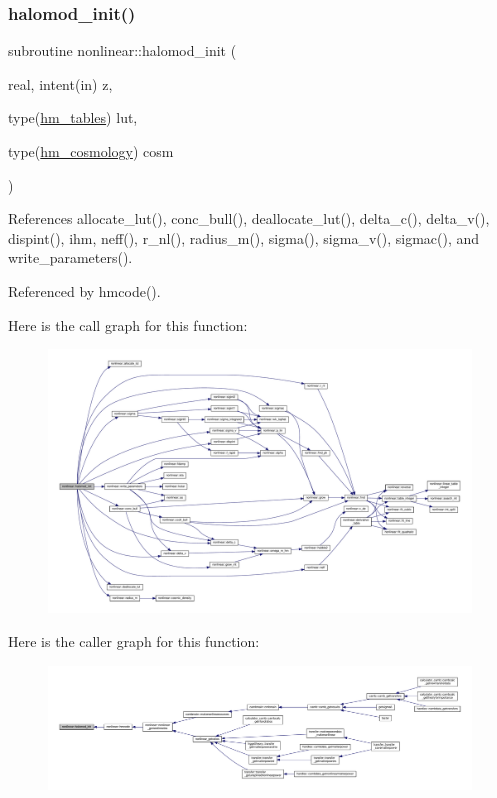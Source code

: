 \subsubsection{\texorpdfstring{halomod\+\_\+init()}{halomod\_init()}}
{\footnotesize\ttfamily subroutine nonlinear\+::halomod\+\_\+init (\begin{DoxyParamCaption}\item[{real, intent(in)}]{z,  }\item[{type(\mbox{\hyperlink{structnonlinear_1_1hm__tables}{hm\+\_\+tables}})}]{lut,  }\item[{type(\mbox{\hyperlink{structnonlinear_1_1hm__cosmology}{hm\+\_\+cosmology}})}]{cosm }\end{DoxyParamCaption})\hspace{0.3cm}{\ttfamily [private]}}



References allocate\+\_\+lut(), conc\+\_\+bull(), deallocate\+\_\+lut(), delta\+\_\+c(), delta\+\_\+v(), dispint(), ihm, neff(), r\+\_\+nl(), radius\+\_\+m(), sigma(), sigma\+\_\+v(), sigmac(), and write\+\_\+parameters().



Referenced by hmcode().

Here is the call graph for this function\+:
\nopagebreak
\begin{figure}[H]
\begin{center}
\leavevmode
\includegraphics[width=350pt]{namespacenonlinear_af025b4b6e2a711cea66352e50ea6de97_cgraph}
\end{center}
\end{figure}
Here is the caller graph for this function\+:
\nopagebreak
\begin{figure}[H]
\begin{center}
\leavevmode
\includegraphics[width=350pt]{namespacenonlinear_af025b4b6e2a711cea66352e50ea6de97_icgraph}
\end{center}
\end{figure}
\mbox{\label{namespacenonlinear_acf9ab8f72085502eea51c43dcf5ad67e}} 

